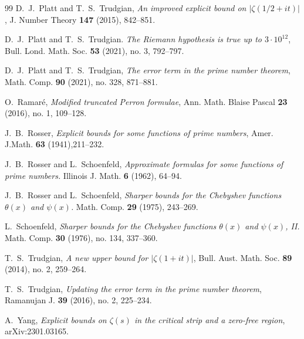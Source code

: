 \documentclass[10pt]{amsart}
\theoremstyle{definition}
\numberwithin{equation}{section}
\begin{document}
\begin{thebibliography}{99}
 D.~J.~Platt and T.~S.~Trudgian, 
{\it An improved explicit bound on $|\zeta(1/2 + it)|$}, 
 J. Number Theory {\bf 147} (2015), 842--851.

 D.~J.~Platt and T.~S.~Trudgian. 
{\it The Riemann hypothesis is true up to $3\cdot10^{12}$}, 
Bull. Lond. Math. Soc. {\bf 53} (2021), no. 3, 792--797.

 D.~J.~Platt and T.~S.~Trudgian, 
{\it  The error term in the prime number theorem},
Math. Comp. {\bf 90} (2021), no. 328, 871--881. 

O.~Ramar\'e, 
{\it Modified truncated Perron formulae}, 
Ann. Math. Blaise Pascal {\bf 23} (2016), no. 1, 109--128. 

J.~B.~Rosser, 
{\it Explicit bounds for some functions of prime numbers}, 
Amer. J.Math. {\bf 63} (1941),211--232.

J.~B.~Rosser and L.~Schoenfeld, 
{\it Approximate formulas for some functions of prime numbers.}
 Illinois J. Math. {\bf 6} (1962), 64--94.

J.~B.~Rosser and L.~Schoenfeld, 
{\it Sharper bounds for the Chebyshev functions $\theta(x)$ and $\psi(x)$.} 
 Math. Comp. {\bf 29} (1975), 243--269. 

L.~Schoenfeld, 
{\it Sharper bounds for the Chebyshev functions $\theta(x)$ and $\psi(x)$, II.} 
 Math. Comp. {\bf 30} (1976), no. 134, 337--360.

T.~S.~Trudgian, 
{\it A new upper bound for $|\zeta(1 + it)|$}, 
 Bull. Aust. Math. Soc. {\bf 89} (2014), no. 2, 259--264. 

T.~S.~Trudgian, 
{\it Updating the error term in the prime number theorem},
Ramanujan J. {\bf 39} (2016), no. 2, 225--234.

A.~Yang, 
{\it Explicit bounds on $\zeta(s)$ in the critical strip and a zero-free region}, arXiv:2301.03165. 

\end{thebibliography}


\newpage
\end{document}
